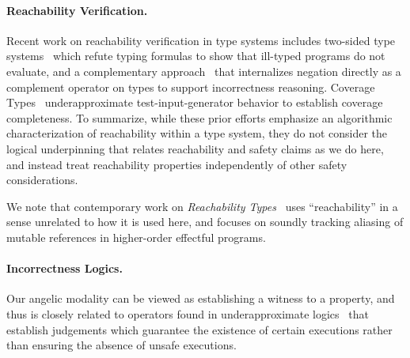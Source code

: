 \paragraph{Reachability Verification.}
Recent work on reachability verification in type systems includes
two-sided type systems~\cite{Ill-types} which refute typing formulas
to show that ill-typed programs do not evaluate, and a complementary
approach~\cite{RamsayIncorType} that internalizes negation directly as
a complement operator on types to support incorrectness reasoning.
Coverage Types~\cite{CoverageType} underapproximate
test-input-generator behavior to establish coverage completeness.
  To summarize, while these prior efforts
emphasize an algorithmic characterization of reachability within a
type system, they do not consider the logical underpinning that
relates reachability and safety claims as we do here, and instead
treat reachability properties independently of other safety
considerations.

We note that contemporary work on \emph{Reachability
  Types}~\cite{ReachabilityTypes, WBJBR+24} uses ``reachability'' in a
sense unrelated to how it is used here, and focuses on soundly
tracking aliasing of mutable references in higher-order effectful
programs.

\paragraph{Incorrectness Logics.}
Our angelic modality can be viewed as establishing a witness to a
property, and thus is closely related to operators found in
underapproximate logics~\cite{ReverseHoareLogic, OHP19, RBD+20,
  RHLE, HyperHoareLogic, QuantitativeWeakestHyperPre, UTurn,
  BackwardIncorrectness} that establish judgements which guarantee the
existence of certain executions rather than ensuring the absence of
unsafe executions.

